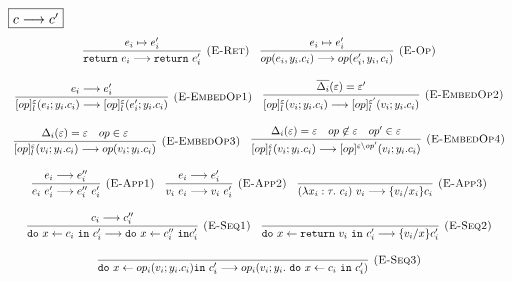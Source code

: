 \begin{figure}[p]
\footnotesize{

$\fbox{$c \longrightarrow c'$}$
\[
\begin{array}{c}
\infer[\textsc{(E-Ret)}]
  {\texttt{return}\ e_i \longrightarrow \texttt{return}\ e_i'}
  {e_i \mapsto e_i'} \quad
  
\infer[\textsc{(E-Op)}]
  {op(e_i,y_i.c_i) \longrightarrow op(e_i', y_i, c_i)}
  {e_i \mapsto e_i'} \\[3ex]
 
 
\infer[\textsc{(E-EmbedOp1)}]
{[op]^\varepsilon_l(e_i; y_i.c_i) \longrightarrow [op]^{\varepsilon}_l(e_i'; y_i.c_i) }
{e_i \longrightarrow e_i'} \quad
 
\infer[\textsc{(E-EmbedOp2)}]
{[op]^\varepsilon_l(v_i; y_i.c_i) \longrightarrow [op]^{\varepsilon'}_l(v_i; y_i.c_i) }
{\overline{\Delta_i}(\varepsilon) = \varepsilon'} \\[3ex]

\infer[\textsc{(E-EmbedOp3)}]
{[op]^\varepsilon_l(v_i; y_i.c_i) \longrightarrow op(v_i; y_i.c_i) }
{\Delta_i(\varepsilon) = \varepsilon & op \in \varepsilon} \quad

\infer[\textsc{(E-EmbedOp4)}]
{[op]^\varepsilon_l(v_i; y_i.c_i) \longrightarrow [op]^{\varepsilon \setminus op'}(v_i; y_i.c_i) }
{\Delta_i(\varepsilon) = \varepsilon & op \not\in \varepsilon & op' \in \varepsilon} \\[3ex]


\infer[\textsc{(E-App1)}]
  {e_i\ e_i' \longrightarrow e_i''\ e_i'}
  {e_i \longrightarrow e_i''}  \quad
  
\infer[\textsc{(E-App2)}]
  {v_i \ e_i \longrightarrow v_i\ e_i'}
  {e_i\longrightarrow e_i'}  \quad
  
\infer[\textsc{(E-App3)}]
  {(\lambda x_i:\tau.\ c_i) \ v_i \longrightarrow \{v_i/x_i\}c_i}
  {} \\[3ex]
  
  
\infer[\textsc{(E-Seq1)}]
  {\texttt{do}\ x \leftarrow c_i\ \texttt{in}\ c_i' \longrightarrow \texttt{do}\ x \leftarrow c_i''\ \texttt{in} c_i'}
  {c_i \longrightarrow c_i''}  \quad
  
\infer[\textsc{(E-Seq2)}]
  {\texttt{do}\ x \leftarrow \texttt{return}\ v_i \ \texttt{in}\ c_i' \longrightarrow \{v_i/x\} c_i'}
  {} \\[3ex]
  
\infer[\textsc{(E-Seq3)}]
  {\texttt{do}\ x \leftarrow op_i(v_i; y_i.c_i) \texttt{in}\ c_i' \longrightarrow op_i(v_i; y_i. \m{do} x \leftarrow c_i \m{in} c_i')}
  {} \\[3ex]
  

\end{array}\]}
\end{figure}
